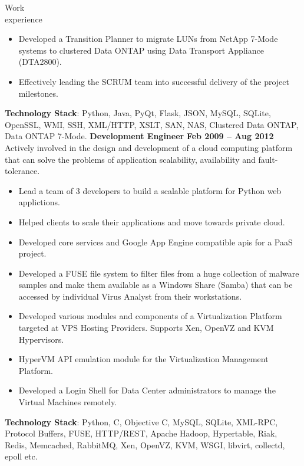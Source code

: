 \documentclass{resume}
\begin{document}
\begin{category}{Work \\experience}
\begin{itemize}
  \item Developed a Transition Planner to migrate LUNs from NetApp 7-Mode systems to clustered
    Data ONTAP using Data Transport Appliance (DTA2800).
  \item Effectively leading the SCRUM team into successful delivery of the project milestones.
  \end{itemize}
  \citemnobullet \textbf{Technology Stack}: Python, Java, PyQt, Flask, JSON, MySQL, SQLite, OpenSSL, WMI, SSH,
  XML/HTTP, XSLT, SAN, NAS, Clustered Data ONTAP, Data ONTAP 7-Mode.
  \citemnobullet \textbf{Development Engineer} \hfill \textbf{Feb 2009 -- Aug 2012}
  \citemnobullet Actively involved in the design and development of a cloud computing platform 
  that can solve the problems of application scalability, availability and fault-tolerance.
  \begin{itemize} 
  \item Lead a team of 3 developers to build a scalable platform for Python web applictions.
  \item Helped clients to scale their applications and move towards private cloud.
  \item Developed core services and Google App Engine compatible apis for a PaaS project.
  \item Developed a FUSE file system to filter files from a huge collection of malware samples 
    and make them available as a Windows Share (Samba) that can be accessed by individual 
    Virus Analyst from their workstations.
  \item Developed various modules and components of a Virtualization Platform targeted at VPS Hosting
    Providers. Supports Xen, OpenVZ and KVM Hypervisors.
  \item HyperVM API emulation module for the Virtualization Management Platform.
  \item Developed a Login Shell for Data Center administrators to manage the
    Virtual Machines remotely.
  \end{itemize}
  \citemnobullet \textbf{Technology Stack}: Python, C, Objective C, MySQL, SQLite, XML-RPC,
  Protocol Buffers, FUSE, HTTP/REST, Apache Hadoop, Hypertable, Riak, Redis,
  Memcached, RabbitMQ, Xen, OpenVZ, KVM, WSGI, libvirt, collectd, epoll etc.
\end{category}
\end{document}
